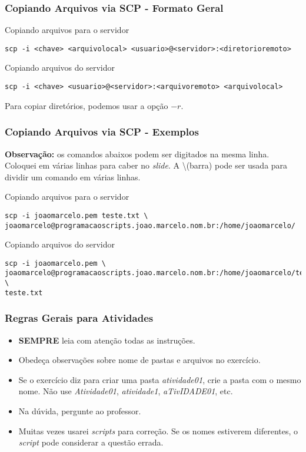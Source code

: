 \documentclass{beamer}
\begin{document}
\begin{frame}[fragile]
   \frametitle{Copiando Arquivos via SCP - Formato Geral}
   \small
   \begin{block}{Copiando arquivos para o servidor}
   \scriptsize
   \begin{verbatim}
scp -i <chave> <arquivolocal> <usuario>@<servidor>:<diretorioremoto>
   \end{verbatim}
   \end{block}
   \normalsize
   \begin{block}{Copiando arquivos do servidor}
   \scriptsize
   \begin{verbatim}
scp -i <chave> <usuario>@<servidor>:<arquivoremoto> <arquivolocal>
   \end{verbatim}
   \end{block}
   Para copiar diretórios, podemos usar a opção $-r$.
\end{frame}

\begin{frame}[fragile]
   \frametitle{Copiando Arquivos via SCP - Exemplos}
   \small
   \textbf{Observação:} os comandos abaixos podem ser digitados na mesma linha. Coloquei em várias linhas para caber no \textit{slide}. A \textbackslash (barra)  pode ser usada para dividir um comando em várias linhas.
   \normalsize
   \begin{block}{Copiando arquivos para o servidor}
   \scriptsize
   \begin{verbatim}
scp -i joaomarcelo.pem teste.txt \
joaomarcelo@programacaoscripts.joao.marcelo.nom.br:/home/joaomarcelo/
   \end{verbatim}
   \end{block}
   \normalsize
   \begin{block}{Copiando arquivos do servidor}
   \scriptsize
   \begin{verbatim}
scp -i joaomarcelo.pem \
joaomarcelo@programacaoscripts.joao.marcelo.nom.br:/home/joaomarcelo/teste.txt \
teste.txt
   \end{verbatim}
   \end{block}
\end{frame}

\begin{frame}
   \frametitle{Regras Gerais para Atividades}
   \begin{itemize}
      \item \textbf{SEMPRE} leia com atenção todas as instruções.
      \item Obedeça observações sobre nome de pastas e arquivos no exercício.
      \item Se o exercício diz para criar uma pasta \textit{atividade01}, crie a pasta com o mesmo nome. Não use \textit{Atividade01}, \textit{atividade1}, \textit{aTivIDADE01}, etc.
      \item Na dúvida, pergunte ao professor.
      \item Muitas vezes usarei \textit{scripts} para correção. Se os nomes estiverem diferentes, o \textit{script} pode considerar a questão errada.
   \end{itemize}
\end{frame}
\end{document}
